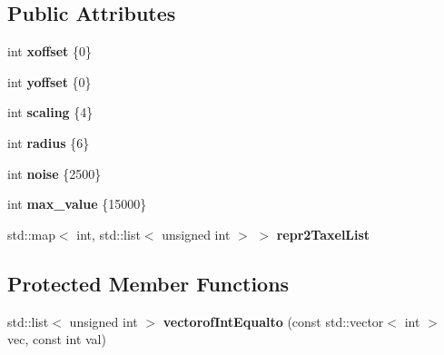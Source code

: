 \subsection*{Public Attributes}
\begin{DoxyCompactItemize}
\item 
\mbox{\label{classev_1_1PAD_a9091308d3c2f3f098b784891c4439216}} 
int {\bfseries xoffset} \{0\}
\item 
\mbox{\label{classev_1_1PAD_a817c926d6b55ff09b84f6757310d5d82}} 
int {\bfseries yoffset} \{0\}
\item 
\mbox{\label{classev_1_1PAD_a0aef1dfdf94d229d889abef277800b42}} 
int {\bfseries scaling} \{4\}
\item 
\mbox{\label{classev_1_1PAD_ade492e537a0159cb47c07d9da53694a1}} 
int {\bfseries radius} \{6\}
\item 
\mbox{\label{classev_1_1PAD_aed64657855e265d0fca71102bb716768}} 
int {\bfseries noise} \{2500\}
\item 
\mbox{\label{classev_1_1PAD_a4c080b39fe66cb40d0975ac38e3f749f}} 
int {\bfseries max\+\_\+value} \{15000\}
\item 
\mbox{\label{classev_1_1PAD_a0bd154850385c9eeb5b3e67a66963ece}} 
std\+::map$<$ int, std\+::list$<$ unsigned int $>$ $>$ {\bfseries repr2\+Taxel\+List}
\end{DoxyCompactItemize}
\subsection*{Protected Member Functions}
\begin{DoxyCompactItemize}
\item 
\mbox{\label{classev_1_1PAD_ae24c2e7c4e1a805fe18ba89806e032ad}} 
std\+::list$<$ unsigned int $>$ {\bfseries vectorof\+Int\+Equalto} (const std\+::vector$<$ int $>$ vec, const int val)
\end{DoxyCompactItemize}
